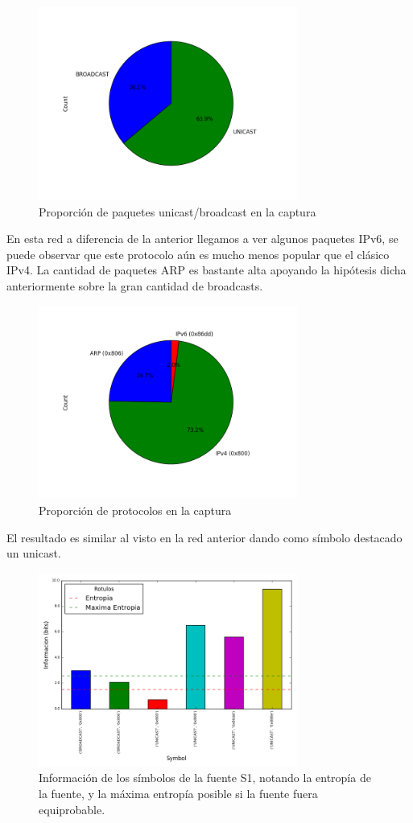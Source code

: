 \begin{figure}[H]
 \centering
 \includegraphics[width=8.5cm]{figs/broadcast_proportion_oficina_mediana_wifi_S1_output.png}
 \caption{\normalfont Proporción de paquetes unicast/broadcast en la captura}
\end{figure}

En esta red a diferencia de la anterior llegamos a ver algunos paquetes IPv6, se puede observar que este protocolo aún es mucho menos popular que el clásico IPv4. La cantidad de paquetes ARP es bastante alta apoyando la hipótesis dicha anteriormente sobre la gran cantidad de broadcasts.

\begin{figure}[H]
 \centering
 \includegraphics[width=8.5cm]{figs/protocols_proportion_oficina_mediana_wifi_S1_output.png}
 \caption{\normalfont Proporción de protocolos en la captura}
\end{figure}

El resultado es similar al visto en la red anterior dando como símbolo destacado un unicast.

\begin{figure}[H]
 \centering
 \includegraphics[width=8.5cm]{figs/information_oficina_mediana_wifi_S1_output.png}
 \caption{\normalfont Información de los símbolos de la fuente S1, notando la entropía de la fuente, y la máxima entropía posible si la fuente fuera equiprobable.}
\end{figure}

